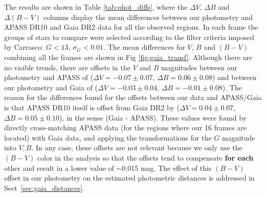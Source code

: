 \documentclass[draft]{aa}
\begin{document}
The results are shown in Table \ref{tab:phot_diffs}, where the $\Delta V$,
$\Delta B$ and $\Delta (B-V)$ columns display the mean differences
between our photometry and APASS DR10 and Gaia DR2 data for all the observed
regions.
%
In each frame the groups of stars to compare were selected according
to the filter criteria imposed by Carrasco: $G<13$, $\sigma_{G}<0.01$.
%
The mean differences for $V$, $B$ and $(B-V)$ combining all
the frames are shown in Fig \ref{fig:gaia_transf}. Although there are no
visible trends, there are offsets in the $V$ and $B$ magnitudes between our
photometry and APASS of ($\Delta V=-0.07\pm0.07$, $\Delta B=0.06\pm0.08$) and
between our photometry and Gaia of ($\Delta V=-0.03\pm0.04$,
$\Delta B=-0.01\pm0.08$).
%
The reason for the differences found for the offsets between our data and
APASS/Gaia is that APASS DR10 itself is offset from Gaia
DR2 by ($\Delta V=0.04\pm0.07$, $\Delta B=0.05\pm0.10$), in the sense (Gaia -
APASS).
These values were found by directly cross-matching APASS data (for the regions where
our 16 frames are located) with Gaia data, and applying the
transformations for the $G$ magnitude into $V,B$.
%
In any case, these offsets are not relevant because we only use the $(B-V)$
color in the analysis so that the offsets tend to compensate \textbf{for each} other
and result in a lower value of $\sim$0.015 mag.
The effect of this $(B-V)$ offset in our photometry on the estimated
photometric distances is addressed in Sect~\ref{sec:gaia_distances}.\\
\end{document}
